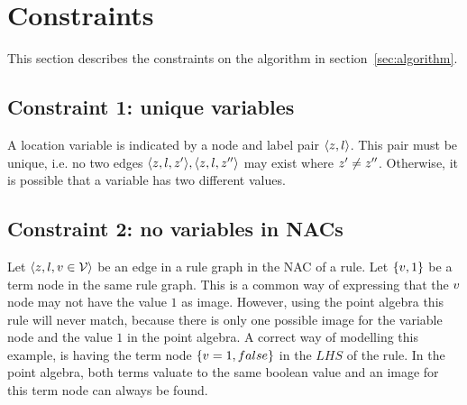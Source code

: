 \section{Constraints}

This section describes the constraints on the algorithm in section~\ref{sec:algorithm}.

\subsection{Constraint 1: unique variables}\label{sec:constraint-1}
A location variable is indicated by a node and label pair $\langle z, l\rangle$. This pair must be unique, i.e. no two edges $\langle z, l, z'\rangle, \langle z, l, z''\rangle$ may exist where $z' \neq z''$. Otherwise, it is possible that a variable has two different values.

\begin{comment}
\subsection{Constraint 2: variable persistency}
All locations variables in an STS are initialized and no new variables are added. In a GG, it is possible to delete and create new variables in the transformation rules. 
Dit is eigenlijk geen probleem, zolang aan constraint 1 gehouden wordt. En dat is of triviaal of onmogelijk.
\end{comment}

\subsection{Constraint 2: no variables in NACs}
Let $\langle z, l, v \in \mathcal{V}\rangle$ be an edge in a rule graph in the NAC of a rule. Let $\{v, 1\}$ be a term node in the same rule graph. This is a common way of expressing that the $v$ node may not have the value $1$ as image. However, using the point algebra this rule will never match, because there is only one possible image for the variable node and the value $1$ in the point algebra. A correct way of modelling this example, is having the term node $\{v = 1, false\}$ in the $\mathit{LHS}$ of the rule. In the point algebra, both terms valuate to the same boolean value and an image for this term node can always be found.

